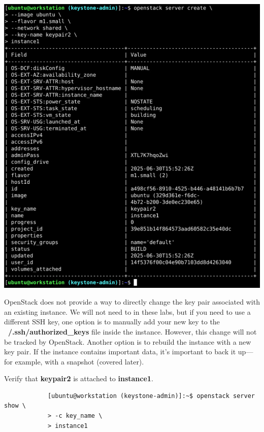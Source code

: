 \documentclass[letterpaper, 12pt]{article}
\begin{document}
\begin{enumerate}
\begin{labstep}
        \begin{center}
            \includegraphics[width=\linewidth]{images/part8/step2.png}
        \end{center}
    \end{labstep}

    \begin{tipbox}
        OpenStack does not provide a way to directly change the key pair associated with an existing instance.
        We will not need to in these labs, but if you need to use a different SSH key, one option is to manually add your new key to the \textbf{~/.ssh/authorized\_keys} file inside the instance.
        However, this change will not be tracked by OpenStack.
        Another option is to rebuild the instance with a new key pair.
        If the instance contains important data, it's important to back it up---for example, with a snapshot (covered later).
    \end{tipbox}

    \begin{labstep}
        Verify that \textbf{keypair2} is attached to \textbf{instance1}.
        \begin{lstlisting}
            [ubuntu@workstation (keystone-admin)]:~$ openstack server show \
            > -c key_name \
            > instance1
        \end{lstlisting}


\end{labstep}
\end{enumerate}
\end{document}
